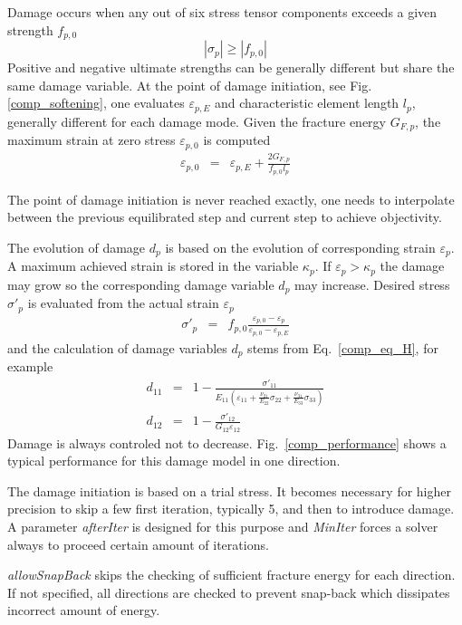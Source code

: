 \documentclass[a4paper]{article}
\newcommand{\param}[1]{{\it #1}}
\begin{document}
Damage occurs when any out of six stress tensor components exceeds a given strength $f_{p,0}$
\begin{equation}
|\sigma_p| \geq |f_{p,0}|
\end{equation}
Positive and negative ultimate strengths can be generally different but share the same damage variable.
At the point of damage initiation, see Fig. \ref{comp_softening}, one evaluates $\varepsilon_{p,E}$ and characteristic element length $l_p$, generally different for each damage mode. Given the fracture energy $G_{F,p}$, the maximum strain at zero stress $\varepsilon_{p,0}$ is computed
\begin{eqnarray}
\varepsilon_{p,0} &=& \varepsilon_{p,E} + \frac{2G_{F,p}}{f_{p,0} l_p}
\end{eqnarray}

The point of damage initiation is never reached exactly, one needs to interpolate between the previous equilibrated step and current step to achieve objectivity.

The evolution of damage $d_p$ is based on the evolution of corresponding strain $\varepsilon_p$. A maximum achieved strain is stored in the variable $\kappa_p$. If $\varepsilon_p > \kappa_p$ the damage may grow so the corresponding damage variable $d_p$ may increase. Desired stress $\sigma'_p$ is evaluated from the actual strain $\varepsilon_p$
\begin{eqnarray}
\sigma'_p &=& f_{p,0} \frac{\varepsilon_{p,0} - \varepsilon_p}{\varepsilon_{p,0}-\varepsilon_{p,E}}
\end{eqnarray}
and the calculation of damage variables $d_p$ stems from Eq.~\ref{comp_eq_H}, for example
\begin{eqnarray}
d_{11} &=& 1 - \frac{\sigma'_{11}}{E_{11}\left(\varepsilon_{11}+\frac{\nu_{21}}{E_{22}}\sigma_{22}+ \frac{\nu_{31}}{E_{33}}\sigma_{33} \right)}\\
d_{12} &=& 1 - \frac{\sigma'_{12}}{G_{12}\varepsilon_{12}}
\end{eqnarray}
Damage is always controled not to decrease. Fig.~\ref{comp_performance} shows a typical performance for this damage model in one direction.

The damage initiation is based on a trial stress. It becomes necessary for  higher precision to skip a few first iteration, typically 5, and then to introduce damage. A parameter \param{afterIter} is designed for this purpose and \param{MinIter} forces a solver always to proceed certain amount of iterations.

\param{allowSnapBack} skips the checking of sufficient fracture energy for each direction. If not specified, all directions are checked to prevent snap-back which dissipates incorrect amount of energy.
\end{document}
